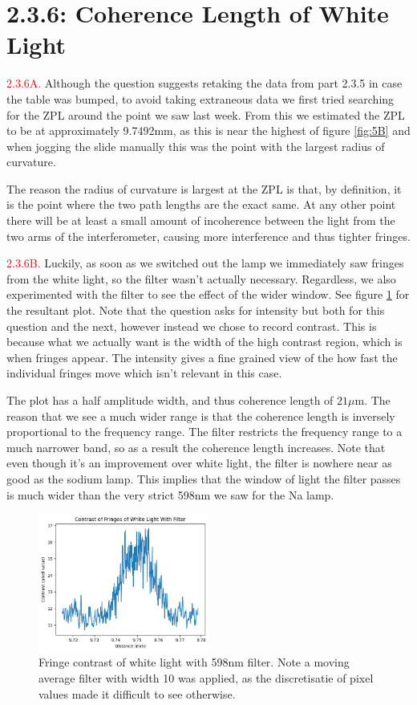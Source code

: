 \documentclass[letterpaper, reqno,11pt]{article}
\begin{document}
\section{2.3.6: Coherence Length of White Light}

\noindent \textcolor{red}{2.3.6A.} Although the question suggests retaking the data from part 2.3.5 in case the table was bumped, to avoid taking extraneous data we first tried searching for the ZPL around the point we saw last week. From this we estimated the ZPL to be at approximately 9.7492mm, as this is near the highest of figure \ref{fig:5B} and when jogging the slide manually this was the point with the largest radius of curvature.

The reason the radius of curvature is largest at the ZPL is that, by definition, it is the point where the two path lengths are the exact same. At any other point there will be at least a small amount of incoherence between the light from the two arms of the interferometer, causing more interference and thus tighter fringes.

\noindent \textcolor{red}{2.3.6B.} Luckily, as soon as we switched out the lamp we immediately saw fringes from the white light, so the filter wasn't actually necessary. Regardless, we also experimented with the filter to see the effect of the wider window. See figure \ref{fig:6B} for the resultant plot. Note that the question asks for intensity but both for this question and the next, however instead we chose to record contrast. This is because what we actually want is the width of the high contrast region, which is when fringes appear. The intensity gives a fine grained view of the how fast the individual fringes move which isn't relevant in this case.

The plot has a half amplitude width, and thus coherence length of $21\mu$m. The reason that we see a much wider range is that the coherence length is inversely proportional to the frequency range. The filter restricts the frequency range to a much narrower band, so as a result the coherence length increases. Note that even though it's an improvement over white light, the filter is nowhere near as good as the sodium lamp. This implies that the window of light the filter passes is much wider than the very strict 598nm we saw for the Na lamp.

\begin{figure}[htpb]
    \centering
    \includegraphics[width=0.5\textwidth]{6B}
    \caption{Fringe contrast of white light with 598nm filter. Note a moving average filter with width 10 was applied, as the discretisatie of pixel values made it difficult to see otherwise.}
    \label{fig:6B}
\end{figure}
\end{document}
